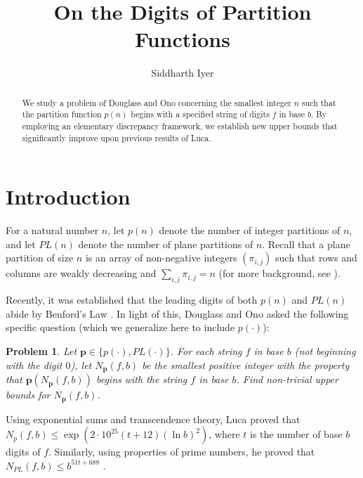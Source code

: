 \documentclass[12pt]{amsart}
\numberwithin{equation}{section}
\newtheorem{prob}[thm]{Problem}
\begin{document}
\title[Digits of partition functions]
{On the Digits of Partition Functions}

\author[Siddharth Iyer] {Siddharth Iyer}
\address{School of Mathematics and Statistics, University of New South Wales, Sydney, NSW 2052, Australia}

\begin{abstract}
We study a problem of Douglass and Ono concerning the smallest integer $n$ such that the partition function $p(n)$ begins with a specified string of digits $f$ in base $b$. By employing an elementary discrepancy framework, we establish new upper bounds that significantly improve upon previous results of Luca.
\end{abstract}


\maketitle

\section{Introduction}
For a natural number $n$, let $p(n)$ denote the number of integer partitions of $n$, and let $PL(n)$ denote the number of plane partitions of $n$. Recall that a plane partition of size $n$ is an array of non-negative integers $(\pi_{i,j})$ such that rows and columns are weakly decreasing and $\sum_{i,j} \pi_{i,j} = n$ (for more background, see \cite{Andrews}). 

Recently, it was established that the leading digits of both $p(n)$ and $PL(n)$ abide by Benford's Law \cite{Anderson, Ono}. In light of this, Douglass and Ono \cite{Ono} asked the following specific question (which we generalize here to include $p(\cdot)$):

\begin{prob}
Let $\mathbf{p} \in \{p(\cdot), PL(\cdot)\}$. For each string $f$ in base $b$ (not beginning with the digit $0$), let $N_{\mathbf{p}}(f,b)$ be the smallest positive integer with the property that $\mathbf{p}(N_{\mathbf{p}}(f,b))$ begins with the string $f$ in base $b$. Find non-trivial upper bounds for $N_{\mathbf{p}}(f,b)$.
\end{prob}

Using exponential sums and transcendence theory, Luca \cite{LucaPart2} proved that $N_{p}(f,b) \leq \exp(2\cdot 10^{25}(t+12)(\ln b)^2)$, where $t$ is the number of base $b$ digits of $f$. Similarly, using properties of prime numbers, he proved that $N_{PL}(f,b) \leq b^{51t+688}$ \cite{LucaPart1}. 
\end{document}
